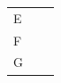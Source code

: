 {\begin{center}
\begin{xtabular*}{\mytablewidth}[t]{|p{10\mystarwidth}|p{10\mystarwidth}|p{10\mystarwidth}|}
     \tabularnewline{}
    
    
        E &
    
    
         &
    
    
     \tabularnewline{}
    
    
        F &
    
    
         &
    
    
     \tabularnewline{}
    
    
        G &
    

\end{xtabular*}
\end{center}}
